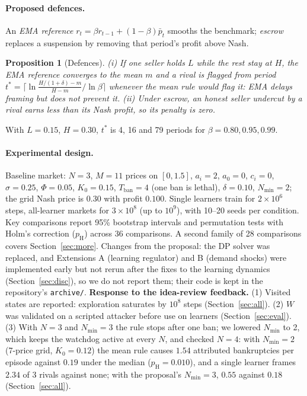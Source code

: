 \documentclass{article}
\newtheorem{proposition}{Proposition}
\newcommand{\Nmin}{N_{\min}}
\newcommand{\Tban}{T_{\mathrm{ban}}}
\begin{document}
\paragraph{Proposed defences.} An \emph{EMA reference} $r_t=\beta r_{t-1}+(1-\beta)\bar p_t$ smooths the benchmark; \emph{escrow} replaces a suspension by removing that period's profit above Nash.

\begin{proposition}[Defences]\label{prop:def}
(i) If one seller holds $L$ while the rest stay at $H$, the EMA reference converges to the mean $m$ and a rival is flagged from period $t^\ast=\lceil\ln\frac{H/(1+\delta)-m}{H-m}/\ln\beta\rceil$ whenever the mean rule would flag it: EMA delays framing but does not prevent it. (ii) Under escrow, an honest seller undercut by a rival earns less than its Nash profit, so its penalty is zero.
\end{proposition}
With $L=0.15$, $H=0.30$, $t^\ast$ is 4, 16 and 79 periods for $\beta=0.80, 0.95, 0.99$.

\paragraph{Experimental design.} Baseline market: $N=3$, $M=11$ prices on $[0,1.5]$, $a_i=2$, $a_0=0$, $c_i=0$, $\sigma=0.25$, $\Phi=0.05$, $K_0=0.15$, $\Tban=4$ (one ban is lethal), $\delta=0.10$, $\Nmin=2$; the grid Nash price is $0.30$ with profit $0.100$. Single learners train for $2\times10^6$ steps, all-learner markets for $3\times10^8$ (up to $10^9$), with 10--20 seeds per condition. Key comparisons report 95\% bootstrap intervals and permutation tests with Holm's correction ($p_{\mathrm H}$) across 36 comparisons. A second family of 28 comparisons covers Section~\ref{sec:more}. Changes from the proposal: the DP solver was replaced, and Extensions A (learning regulator) and B (demand shocks) were implemented early but not rerun after the fixes to the learning dynamics (Section~\ref{sec:disc}), so we do not report them; their code is kept in the repository's \texttt{archive/}. \textbf{Response to the idea-review feedback.} (1) Visited states are reported: exploration saturates by $10^8$ steps (Section~\ref{sec:all}). (2) $W$ was validated on a scripted attacker before use on learners (Section~\ref{sec:eval}). (3) With $N=3$ and $\Nmin=3$ the rule stops after one ban; we lowered $\Nmin$ to 2, which keeps the watchdog active at every $N$, and checked $N=4$: with $\Nmin=2$ (7-price grid, $K_0=0.12$) the mean rule causes $1.54$ attributed bankruptcies per episode against $0.19$ under the median ($p_{\mathrm H}=0.010$), and a single learner frames $2.34$ of 3 rivals against none; with the proposal's $\Nmin=3$, $0.55$ against $0.18$ (Section~\ref{sec:all}).
\end{document}
